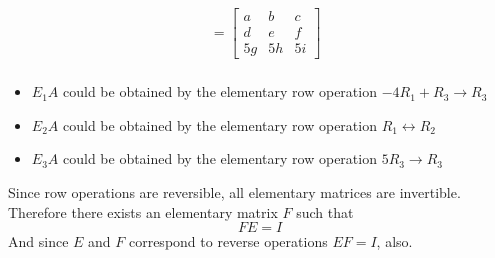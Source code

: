 \documentclass[12pt letter]{report}
\begin{document}
{{\begin{align*}
            & = \begin{bmatrix}
                  a  & b  & c  \\
                  d  & e  & f  \\
                  5g & 5h & 5i
                \end{bmatrix}                                                                                          \\
    \end{align*}
    \begin{itemize}
      \item     $E_1A$ could be obtained by the elementary row operation $-4R_1 + R_3 \to R_3$
      \item $E_2A$ could be obtained by the elementary row operation $R_1 \leftrightarrow R_2$
      \item $E_3A$ could be obtained by the elementary row operation $5R_3 \to R_3$
    \end{itemize}
  }
}



Since row operations are reversible, all elementary matrices are invertible. Therefore there exists an elementary matrix
$F$ such that
\[
  F E = I
\]
And since $E$ and $F$ correspond to reverse operations $EF = I$, also.
\end{document}
